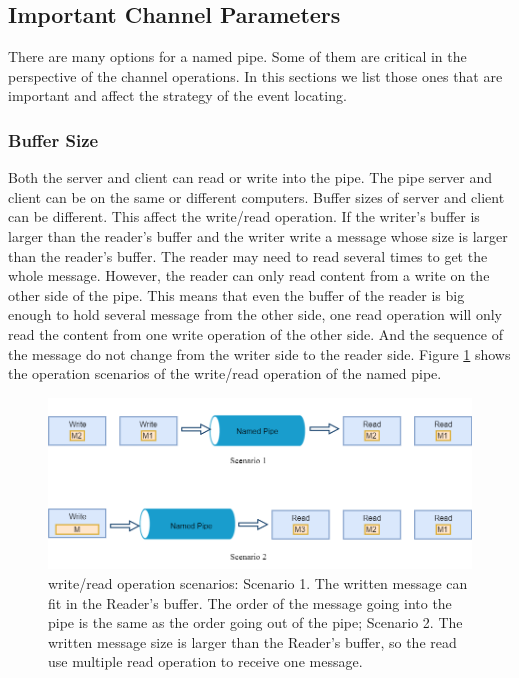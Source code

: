 \subsection{Important Channel Parameters}
There are many options for a named pipe. Some of them are critical in the perspective of the channel operations. In this sections we list those ones that are important and affect the strategy of the event locating.
\subsubsection{Buffer Size}
Both the server and client can read or write into the pipe. The pipe server and client can be on the same or different computers. Buffer sizes of server and client can be different. This affect the write/read operation. If the writer's buffer is larger than the reader's buffer and the writer write a message whose size is larger than the reader's buffer. The reader may need to read several times to get the whole message. However, the reader can only read content from a write on the other side of the pipe. This means that even the buffer of the reader is big enough to hold several message from the other side, one read operation will only read the content from one write operation of the other side. And the sequence of the message do not change from the writer side to the reader side. Figure \ref{event} shows the operation scenarios of the write/read operation of the named pipe.

\begin{figure}[h]
\includegraphics[scale=.48]{Figures/event}
 \caption{write/read operation scenarios: Scenario 1. The written message can fit in the Reader's buffer. The order of the message going into the pipe is the same as the order going out of the pipe; Scenario 2. The written message size is larger than the Reader's buffer, so the read use multiple read operation to receive one message.}
\label{event}
\end{figure}

